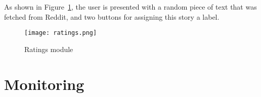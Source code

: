 As shown in Figure~\ref{ratings}, the user is presented with a random piece of text that was fetched from Reddit, and two buttons for assigning this story a label.

\begin{figure}
    \centering
    \texttt{[image: ratings.png]}
    \caption{Ratings module}
    \label{ratings}
\end{figure}

\section{Monitoring}

